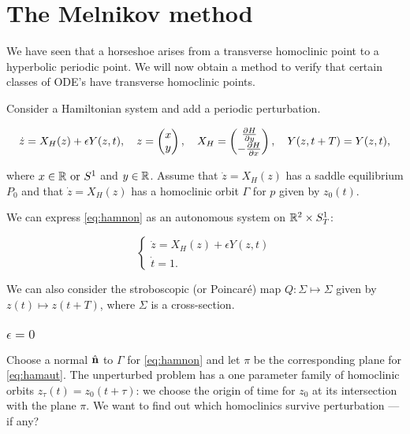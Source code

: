 \documentclass{notes}
\theoremstyle{plain}
\begin{document}
\section{The Melnikov method}

We have seen that a horseshoe arises from a transverse homoclinic
point to a hyperbolic periodic point.  We will now obtain a method to
verify that certain classes of ODE's have transverse homoclinic
points.

Consider a Hamiltonian system and add a periodic perturbation.

\begin{equation}\label{eq:hamnon}
\Dot{z} = X_H(z) + \epsilon Y(z,t), \quad z = \begin{pmatrix} x \\ y
\end{pmatrix}, \quad X_H = \begin{pmatrix} \frac{\partial H}{\partial y} \\ - \frac{\partial H}{\partial x}
\end{pmatrix}, \quad Y(z,t+T) = Y(z,t), 
\end{equation}

where $x \in \mathbb{R} \text{ or } S^1$ and $y \in \mathbb{R}$.  Assume that
$\Dot{z} = X_H(z)$ has a saddle equilibrium $P_0$ and that
$\Dot{z} = X_H(z)$ has a homoclinic orbit $\Gamma$ for $p$ given
by $z_0(t)$.

\vspace{1.5in}

We can express \eqref{eq:hamnon} as an autonomous system on
$\mathbb{R}^2 \times S^1_T$:

\begin{equation}\label{eq:hamaut}
\begin{cases}
\Dot{z} = X_H(z) + \epsilon Y(z,t) \\
\Dot{t} = 1.
\end{cases}
\end{equation}

We can also consider the stroboscopic (or Poincar\'e) map
$Q \colon \Sigma \mapsto \Sigma$ given by $z(t) \mapsto z(t+T)$,
where $\Sigma$ is a cross-section.

\subsubsection*{$\epsilon = 0$}

\vspace{2in}

Choose a normal $\Hat{\mathbf{n}}$ to $\Gamma$ for \eqref{eq:hamnon}
and let $\pi$ be the corresponding plane for \eqref{eq:hamaut}.  The
unperturbed problem has a one parameter family of homoclinic orbits
$z_\tau(t) = z_0(t+\tau)$: we choose the origin of time for $z_0$ at
its intersection with the plane $\pi$.  We want to find out which
homoclinics survive perturbation --- if any?
\end{document}
